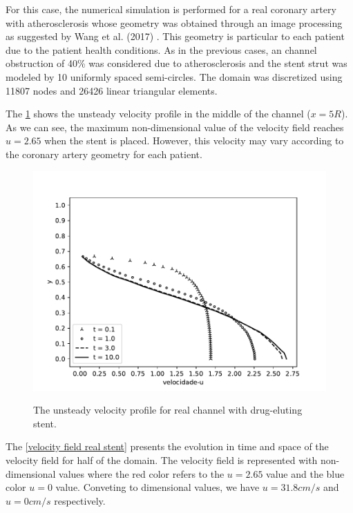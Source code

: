 For this case, the numerical simulation is performed for a real 
coronary artery with atherosclerosis whose geometry was obtained 
through an image processing as suggested by Wang et al. (2017) 
\cite{wang2017}. This geometry is particular to each patient 
due to the patient health conditions. As in the previous cases, 
an channel obstruction of 40\% was considered due to atherosclerosis 
and the stent strut was modeled by
10 uniformly spaced semi-circles.
The domain was discretized using 11807 nodes and 26426 linear 
triangular elements. 

\medskip
The \ref{velocity evolution real stent} shows the unsteady velocity 
profile in the middle of the channel ($x=5R$). 
As we can see, the maximum non-dimensional value of the velocity field 
reaches $u=2.65$ when the stent is placed. 
However, this velocity may vary according to the 
coronary artery geometry for each patient.

\begin{figure}[H]
     \centering
     \includegraphics[scale=1]{./02_chaps/cap_solution/figure/vel_RealStrut_evol.pdf}\\
     \caption{
The unsteady velocity profile for real channel with drug-eluting stent.}
     \label{velocity evolution real stent}
\end{figure}

\newpage
The \ref{velocity field real stent} presents the evolution in 
time and space of the velocity field for half of the domain. 
The velocity field is represented with non-dimensional values 
where the red color refers to the $u=2.65$ value and the blue color 
$u=0$ value. Conveting to dimensional values, 
we have $u=31.8cm/s$ and $u=0cm/s$ respectively.

